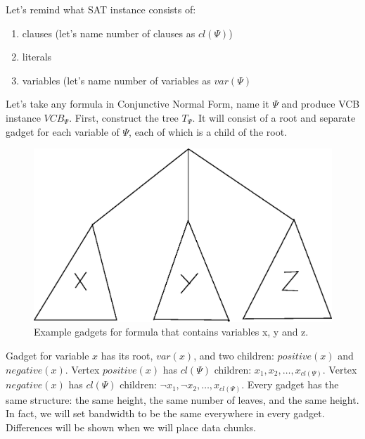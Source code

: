 Let's remind what SAT instance consists of:
\begin{enumerate}
\item clauses (let's name number of clauses as $cl(\Psi)$)
\item literals
\item variables (let's name number of variables as $var(\Psi)$
\end{enumerate}

Let's take any formula in Conjunctive Normal Form, name it $\Psi$ and produce
VCB instance $VCB_{\Psi}$. First, construct the tree $T_{\Psi}$. It will consist of
a root and separate gadget for each variable of $\Psi$, each of which
is a child of the root.


\begin{figure}[htbp]
\includegraphics[width = \columnwidth]{figs/gadgets.eps}
\caption{Example gadgets for formula that contains variables x, y and z.}
\label{fig:gadgets}
\end{figure}

Gadget for variable $x$ has its root, $var(x)$, and two children:
$positive(x)$ and $negative(x)$. Vertex $positive(x)$ has $cl(\Psi)$
children: $x_1, x_2, \ldots, x_{cl(\Psi)}$. Vertex $negative(x)$ has
$cl(\Psi)$ children: $\neg x_1, \neg x_2, \dots, x_{cl(\Psi)}$. Every
gadget has the same structure: the same height, the same number of
leaves, and the same height. In fact, we will set bandwidth to be the
same everywhere in every gadget. Differences will be shown when we
will place data chunks.


